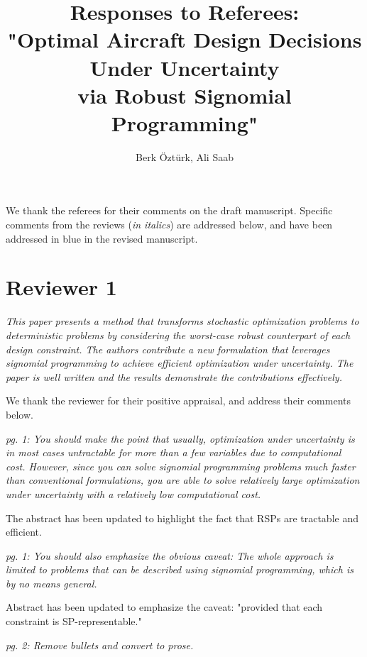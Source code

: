 \documentclass[11pt]{article}
\begin{document}
    \title{Responses to Referees: \\
    "Optimal Aircraft Design Decisions Under Uncertainty \\
    via Robust Signomial Programming"}
    
    \author{Berk \"Ozt\"urk, Ali Saab}

\maketitle

We thank the referees for their comments on the draft manuscript. Specific comments from the reviews (\textit{in italics}) are addressed below, and have been addressed {\color{blue} in blue} in the revised manuscript. 

\section{Reviewer 1}

\textit{This paper presents a method that transforms stochastic optimization problems to deterministic problems by considering the worst-case robust counterpart of each design constraint. The authors contribute a new formulation that leverages signomial programming to achieve efficient optimization under uncertainty. The paper is well written and the results demonstrate the contributions effectively.}

We thank the reviewer for their positive appraisal, and address their comments below. 

\textit{pg. 1: You should make the point that usually, optimization under uncertainty is in most cases untractable for more than a few variables due to computational cost. However, since you can solve signomial programming problems much faster than conventional formulations, you are able to solve relatively large optimization under uncertainty with a relatively low computational cost.}

The abstract has been updated to highlight the fact that RSPs are tractable and efficient. 

\textit{pg. 1: You should also emphasize the obvious caveat: The whole approach is limited to problems that can be described using signomial programming, which is by no means general.}

Abstract has been updated to emphasize the caveat: "provided that each constraint is SP-representable."

\textit{pg. 2: Remove bullets and convert to prose.}
\end{document}
